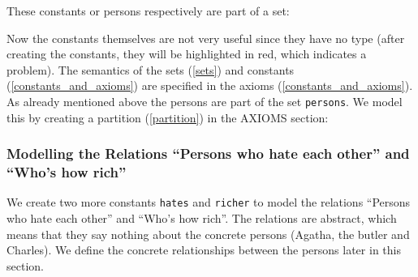These constants or persons respectively are part of a set:


Now the constants themselves are not very useful since they have no type (after creating the constants, they will be highlighted in red, which indicates a problem). The semantics of the sets (\ref{sets}) and constants (\ref{constants_and_axioms}) are specified in the axioms (\ref{constants_and_axioms}). As already mentioned above the persons are part of the set \texttt{persons}. We model this by creating a partition (\ref{partition}) in the \textsf{AXIOMS} section: 




\subsubsection{Modelling the Relations ``Persons who hate each other'' and ``Who's how rich''}

We create two more constants \texttt{hates} and \texttt{richer} to model the relations ``Persons who hate each other'' and ``Who's how rich''. The relations are abstract, which means that they say nothing about the concrete persons (Agatha, the butler and Charles). We define the concrete relationships between the persons later in this section.

